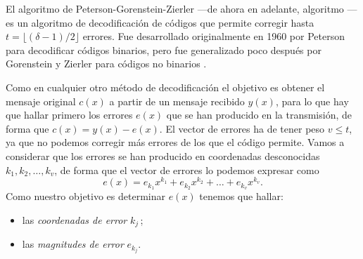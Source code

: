 El algoritmo de Peterson-Gorenstein-Zierler —de ahora en adelante, algoritmo — es un algoritmo de decodificación de códigos  que permite corregir hasta \(t = \lfloor (\delta - 1)/2 \rfloor\) errores.
Fue desarrollado originalmente en 1960 por Peterson \parencite{peterson_encoding_1960} para decodificar códigos  binarios, pero fue generalizado poco después por Gorenstein y Zierler para códigos no binarios \parencite{gorenstein_class_1961}.

Como en cualquier otro método de decodificación el objetivo es obtener el mensaje original \(c(x)\) a partir de un mensaje recibido \(y(x)\), para lo que hay que hallar primero los errores \(e(x)\) que se han producido en la transmisión, de forma que \(c(x) = y(x) - e(x)\).
El vector de errores ha de tener peso \(v \leq t\), ya que no podemos corregir más errores de los que el código permite.
Vamos a considerar que los errores se han producido en coordenadas desconocidas \(k_1, k_2, \dots, k_v\), de forma que el vector de errores lo podemos expresar como
\[
  e(x) = e_{k_1}x^{k_1} + e_{k_2}x^{k_2} + \dots + e_{k_v}x^{k_v}.
\]
Como nuestro objetivo es determinar \(e(x)\) tenemos que hallar: \begin{itemize}
  \item las \textit{coordenadas de error} \(k_j\)\,;
  \item las \textit{magnitudes de error} \(e_{k_j}\).
\end{itemize}

